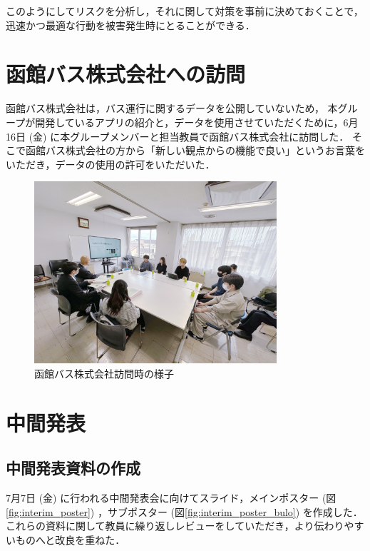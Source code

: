 このようにしてリスクを分析し，それに関して対策を事前に決めておくことで，迅速かつ最適な行動を被害発生時にとることができる．



\section{函館バス株式会社への訪問}
函館バス株式会社は，バス運行に関するデータを公開していないため，
本グループが開発しているアプリの紹介と，データを使用させていただくために，6月16日 (金) に本グループメンバーと担当教員で函館バス株式会社に訪問した．
そこで函館バス株式会社の方から「新しい観点からの機能で良い」というお言葉をいただき，データの使用の許可をいただいた．

\begin{figure}[H]
    \centering
    \includegraphics[width=9cm]{images/hakodate_bus.png}
    \caption{函館バス株式会社訪問時の様子}
    \label{fig:hakodate_bus}
\end{figure}

\section{中間発表}
\subsection{中間発表資料の作成}
7月7日 (金) に行われる中間発表会に向けてスライド，メインポスター (図\ref{fig:interim_poster}) ，サブポスター (図\ref{fig:interim_poster_bulo}) を作成した．これらの資料に関して教員に繰り返しレビューをしていただき，より伝わりやすいものへと改良を重ねた．

